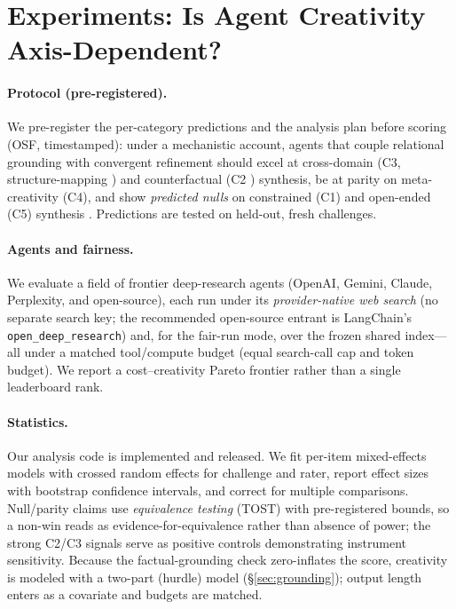 \section{Experiments: Is Agent Creativity Axis-Dependent?}
\label{sec:experiments}

\paragraph{Protocol (pre-registered).} We pre-register the per-category predictions and the analysis plan before scoring (OSF, timestamped): under a mechanistic account, agents that couple relational grounding with convergent refinement should excel at cross-domain (C3, structure-mapping \citep{gentner1983structure}) and counterfactual (C2 \citep{byrne2005rational}) synthesis, be at parity on meta-creativity (C4), and show \emph{predicted nulls} on constrained (C1) and open-ended (C5) synthesis \citep{boden2004creative,campbell1960blind}. Predictions are tested on held-out, fresh challenges.

\paragraph{Agents and fairness.} We evaluate a field of frontier deep-research agents (OpenAI, Gemini, Claude, Perplexity, and open-source), each run under its \emph{provider-native web search} (no separate search key; the recommended open-source entrant is LangChain's \texttt{open\_deep\_research}) and, for the fair-run mode, over the frozen shared index---all under a matched tool/compute budget (equal search-call cap and token budget). We report a cost--creativity Pareto frontier rather than a single leaderboard rank.

\paragraph{Statistics.} Our analysis code is implemented and released. We fit per-item mixed-effects models with crossed random effects for challenge and rater, report effect sizes with bootstrap confidence intervals, and correct for multiple comparisons. Null/parity claims use \emph{equivalence testing} (TOST) with pre-registered bounds, so a non-win reads as evidence-for-equivalence rather than absence of power; the strong C2/C3 signals serve as positive controls demonstrating instrument sensitivity. Because the factual-grounding check zero-inflates the score, creativity is modeled with a two-part (hurdle) model (\S\ref{sec:grounding}); output length enters as a covariate and budgets are matched.

